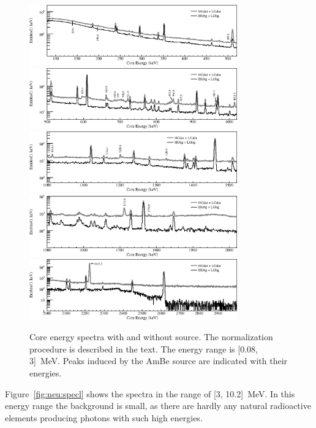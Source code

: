 \begin{figure}[tbhp]
  \centering
  \includegraphics[width=0.8\textwidth,clip]{spectra_0_520keV}
  \includegraphics[width=0.8\textwidth,clip]{spectra_500_1020keV}
  \includegraphics[width=0.8\textwidth,clip]{spectra_1000_1520keV}
  \includegraphics[width=0.8\textwidth,clip]{spectra_1500_2020keV}
  \includegraphics[width=0.8\textwidth,clip]{spectra_2_3MeV}
  \caption{Core energy spectra with and without source. The
    normalization procedure is described in the text. The energy range
    is [0.08, 3]~MeV. Peaks induced by the AmBe source are indicated
    with their energies.}
  \label{fig:neu:spec}
\end{figure}

Figure~\ref{fig:neu:specl} shows the spectra in the range of [3,
10.2]~MeV. In this energy range the background is small, as there are
hardly any natural radioactive elements producing photons with such
high energies.

